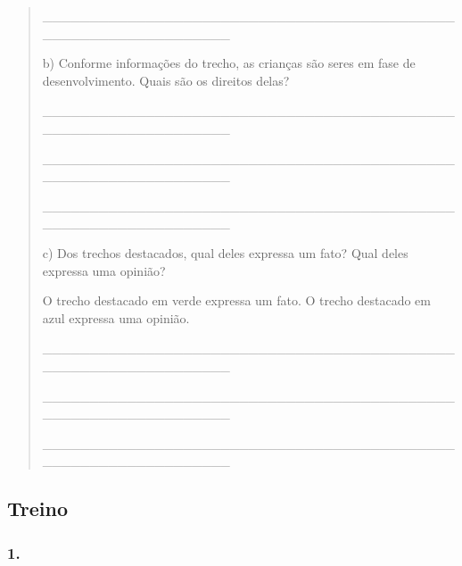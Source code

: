 \begin{quote}
\_\_\_\_\_\_\_\_\_\_\_\_\_\_\_\_\_\_\_\_\_\_\_\_\_\_\_\_\_\_\_\_\_\_\_\_\_\_\_\_\_\_\_\_\_\_\_\_\_\_\_\_\_\_\_\_\_\_\_\_\_\_\_\_

b) Conforme informações do trecho, as crianças são seres em fase de
desenvolvimento. Quais são os direitos delas?

\_\_\_\_\_\_\_\_\_\_\_\_\_\_\_\_\_\_\_\_\_\_\_\_\_\_\_\_\_\_\_\_\_\_\_\_\_\_\_\_\_\_\_\_\_\_\_\_\_\_\_\_\_\_\_\_\_\_\_\_\_\_\_\_

\_\_\_\_\_\_\_\_\_\_\_\_\_\_\_\_\_\_\_\_\_\_\_\_\_\_\_\_\_\_\_\_\_\_\_\_\_\_\_\_\_\_\_\_\_\_\_\_\_\_\_\_\_\_\_\_\_\_\_\_\_\_\_\_

\_\_\_\_\_\_\_\_\_\_\_\_\_\_\_\_\_\_\_\_\_\_\_\_\_\_\_\_\_\_\_\_\_\_\_\_\_\_\_\_\_\_\_\_\_\_\_\_\_\_\_\_\_\_\_\_\_\_\_\_\_\_\_\_

c) Dos trechos destacados, qual deles expressa um fato? Qual deles
expressa uma opinião?

O trecho destacado em verde expressa um fato. O trecho destacado em azul
expressa uma opinião.

\_\_\_\_\_\_\_\_\_\_\_\_\_\_\_\_\_\_\_\_\_\_\_\_\_\_\_\_\_\_\_\_\_\_\_\_\_\_\_\_\_\_\_\_\_\_\_\_\_\_\_\_\_\_\_\_\_\_\_\_\_\_\_\_

\_\_\_\_\_\_\_\_\_\_\_\_\_\_\_\_\_\_\_\_\_\_\_\_\_\_\_\_\_\_\_\_\_\_\_\_\_\_\_\_\_\_\_\_\_\_\_\_\_\_\_\_\_\_\_\_\_\_\_\_\_\_\_\_

\_\_\_\_\_\_\_\_\_\_\_\_\_\_\_\_\_\_\_\_\_\_\_\_\_\_\_\_\_\_\_\_\_\_\_\_\_\_\_\_\_\_\_\_\_\_\_\_\_\_\_\_\_\_\_\_\_\_\_\_\_\_\_\_
\end{quote}

\subsection{Treino}\label{treino-7}

\subsubsection{1. }\label{section-63}

